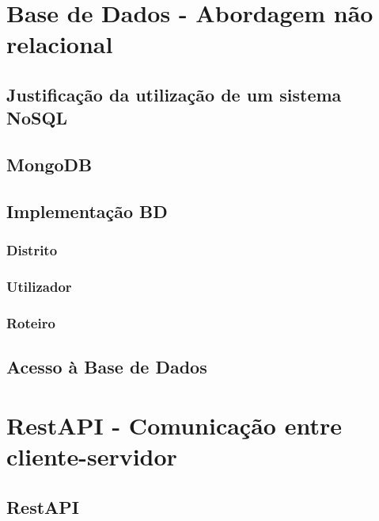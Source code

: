 \documentclass[
  oneside,
  11pt, a4paper,
  footinclude=true,
  headinclude=true,
  cleardoublepage=empty
]{scrbook}
\begin{document}
    \newpage
    
    \section{Base de Dados - Abordagem não relacional}
    \subsection{Justificação da utilização de um sistema NoSQL}
    
    
    \subsection{MongoDB}
    

    \subsection{Implementação BD}
    
  
    \subsubsection{Distrito}
    
    
    \subsubsection{Utilizador}
    
    
    \subsubsection{Roteiro}
    

    \subsection{Acesso à Base de Dados}
    
    
    \newpage
    
    \section{RestAPI - Comunicação entre cliente-servidor}
    
    \subsection{RestAPI}
    
    
\end{document}
